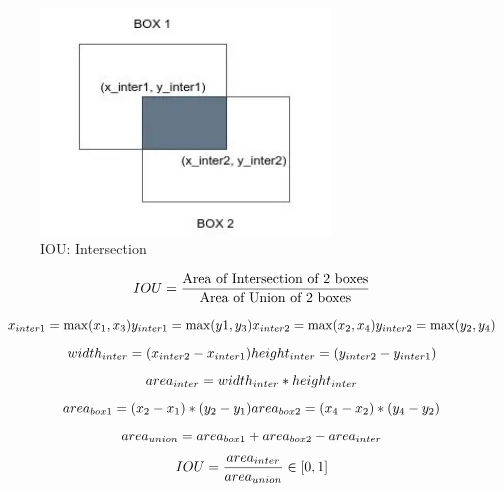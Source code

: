 \begin{table}[H]
\begin{minipage}[b]{0.325\linewidth}
    \end{minipage}
    \hfill
    \begin{minipage}[b]{0.325\linewidth}
        \begin{figure}[H]
            \centering
            \includegraphics[width=\linewidth, height=6cm, keepaspectratio]{Pictures/ds-algo/iou-4.jpg}
            \caption{IOU: Intersection}
        \end{figure}
    \end{minipage}
\end{table}

\[
    \hfill
    \displaystyle IOU = \dfrac{\text{Area of Intersection of 2 boxes}}{\text{Area of Union of 2 boxes}}
    \hfill
\]

\begin{adjustwidth}{-2cm}{-2cm}

\[
    \hfill
    x_{inter1} = \max(x_1, x_3) 
    \hfill 
    y_{inter1} = \max(y1, y_3)
    \hfill
    x_{inter2} = \max(x_2, x_4) 
    \hfill 
    y_{inter2} = \max(y_2, y_4)
    \hfill
\]
\[
    \hfill
    width_{inter} = (x_{inter2} - x_{inter1})
    \hfill
    height_{inter} = (y_{inter2} - y_{inter1})
    \hfill
\]
\[
    \hfill
    area_{inter} = width_{inter} * height_{inter}
    \hfill
\]
\[
    \hfill
    area_{box1} = (x_2 - x_1) * (y_2 - y_1)
    \hfill
    area_{box2} = (x_4 - x_2) * (y_4 - y_2)
    \hfill
\]
\[
    \hfill
    area_{union} = area_{box1} + area_{box2} - area_{inter}
    \hfill
\]
\[
    \displaystyle
    \hfill
    IOU = \dfrac{area_{inter}}{area_{union}} \in [0,1]
    \hfill
\]

\end{adjustwidth}


